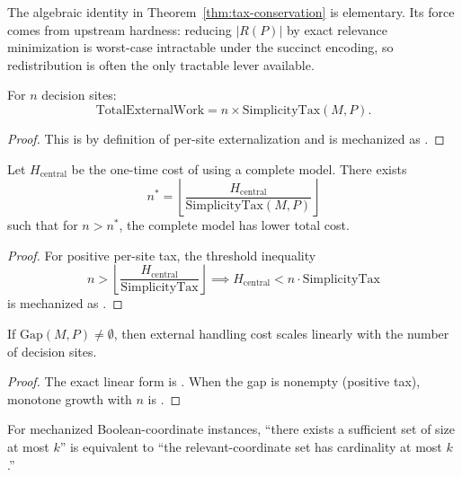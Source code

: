 \begin{remark}
The algebraic identity in Theorem~\ref{thm:tax-conservation} is elementary. Its force comes from upstream hardness: reducing $|R(P)|$ by exact relevance minimization is worst-case intractable under the succinct encoding, so redistribution is often the only tractable lever available.
\end{remark}

\begin{theorem}\label{thm:tax-grows}
For $n$ decision sites:
\[
\text{TotalExternalWork} = n \times \text{SimplicityTax}(M, P).
\]
\end{theorem}

\begin{proof}
This is by definition of per-site externalization and is mechanized as
.
\end{proof}

\begin{theorem}[Amortization]\label{thm:amortization}
Let $H_{\text{central}}$ be the one-time cost of using a complete model. There exists
\[
n^* = \left\lfloor \frac{H_{\text{central}}}{\text{SimplicityTax}(M,P)} \right\rfloor
\]
such that for $n > n^*$, the complete model has lower total cost.
\end{theorem}

\begin{proof}
For positive per-site tax, the threshold inequality
\[
n > \left\lfloor \frac{H_{\text{central}}}{\text{SimplicityTax}} \right\rfloor
\implies
H_{\text{central}} < n\cdot \text{SimplicityTax}
\]
is mechanized as
.
\end{proof}

\begin{corollary}\label{cor:gap-externalization}
If $\text{Gap}(M,P)\neq\emptyset$, then external handling cost scales linearly with the number of decision sites.
\end{corollary}

\begin{proof}
The exact linear form is
.
When the gap is nonempty (positive tax), monotone growth with $n$ is
.
\end{proof}

\begin{corollary}\label{cor:gap-minimization-hard}
For mechanized Boolean-coordinate instances, ``there exists a sufficient set of size at most $k$'' is equivalent to ``the relevant-coordinate set has cardinality at most $k$.''
\end{corollary}

